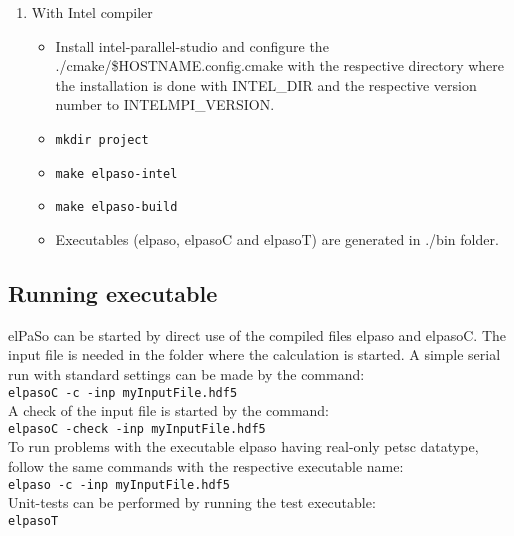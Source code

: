 \begin{enumerate}
\begin{enumerate}
        \item With Intel compiler
        \begin{itemize}
            \item Install intel-parallel-studio and configure the ./cmake/\$HOSTNAME.config.cmake with the respective directory where the installation is done with INTEL\_DIR and the respective version number to INTELMPI\_VERSION.
            \item \texttt{mkdir project}
            \item \texttt{make elpaso-intel}
            \item \texttt{make elpaso-build}
            \item Executables (elpaso, elpasoC and elpasoT) are generated in ./bin folder. 
        \end{itemize}
    \end{enumerate}
\end{enumerate}

\subsection{Running executable}
elPaSo can be started by direct use of the compiled files elpaso and elpasoC. The input file is
needed in the folder where the calculation is started. A simple serial run with standard settings
can be made by the command: \\

{\hspace{2em} \tt elpasoC -c -inp myInputFile.hdf5}\\

A check of the input file is started by the command: \\

{\hspace{2em} \tt elpasoC -check -inp myInputFile.hdf5}\\

To run problems with the executable elpaso having real-only petsc datatype, follow the same commands with the respective executable name: \\

{\hspace{2em} \tt elpaso -c -inp myInputFile.hdf5}\\

Unit-tests can be performed by running the test executable: \\

{\hspace{2em} \tt elpasoT}\\

